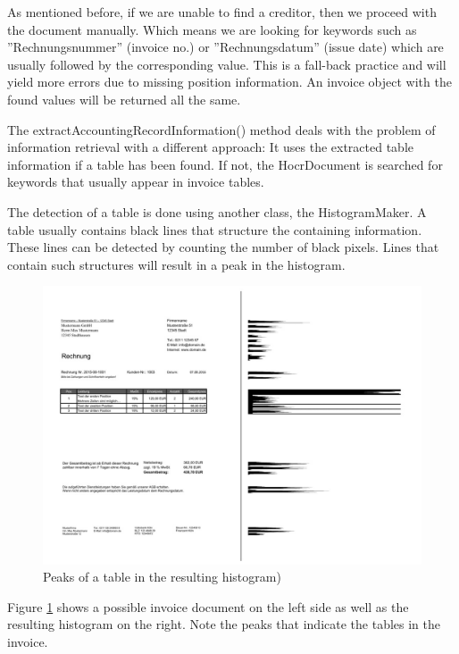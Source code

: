 As mentioned before, if we are unable to find a creditor, then we proceed with the document manually. Which means we are looking for keywords such as ''Rechnungsnummer'' (invoice no.) or ''Rechnungsdatum'' (issue date) which are usually followed by the corresponding value. This is a fall-back practice and will yield more errors due to missing position information. An invoice object with the found values will be returned all the same.

The extractAccountingRecordInformation() method deals with the problem of information retrieval with a different approach: It uses the extracted table information if a table has been found. If not, the HocrDocument is searched for keywords that usually appear in invoice tables.

The detection of a table is done using another class, the HistogramMaker. A table usually contains black lines that structure the containing information. These lines can be detected by counting the number of black pixels. Lines that contain such structures will result in a peak in the histogram. 

\begin{figure}[h]
\centering
\includegraphics[scale=0.6,natwidth=385,natheight=283]{Images/OCR/histogram.jpg}
\caption{Peaks of a table in the resulting histogram)  \label{histogramImage}}
\end{figure}

Figure \ref{histogramImage} shows a possible invoice document on the left side as well as the resulting histogram on the right. Note the peaks that indicate the tables in the invoice.

